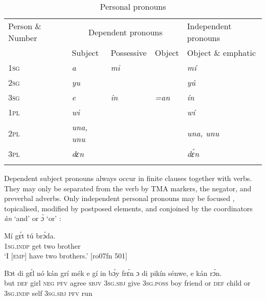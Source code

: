\begin{table}
\caption{Personal pronouns}
\label{tab:key:5.6}

\begin{tabularx}{\textwidth}{Xllll}
\lsptoprule

Person \& Number & \multicolumn{3}{c}{ Dependent pronouns} & Independent pronouns\\
& Subject & \multicolumn{1}{c}{ Possessive} & \multicolumn{1}{c}{ Object} & Object \& emphatic\\
\midrule
\textsc{1sg} & \itshape a & \itshape mi &  & \itshape mí\\
\textsc{2sg} & \itshape yu &  &  & \itshape yú\\
\textsc{3sg} & \itshape e & \itshape in & \itshape =an & \itshape ín\\
\textsc{1pl} & \itshape wi &  &  & \itshape wí\\
\textsc{2pl} & \itshape una, unu &  &  & \itshape una, unu\\
\textsc{3pl} & \itshape dɛn &  &  & \itshape dɛ́n\\
\lspbottomrule
\end{tabularx}
\end{table}
Dependent subject pronouns always occur in finite clauses together with verbs. They may only be separated from the verb by TMA markers, the negator, and preverbal adverbs. Only independent personal pronouns may be focused , topicalised, modified by postposed elements, and conjoined by the coordinators \textit{àn} ‘and’ or \textit{ɔ̀} ‘or’ :


\ea%
    \label{ex:key:278}
    \gll Mí    gɛ́t  tú  brɔ́da.\\
\textsc{1sg.indp}  get  two  brother\\

\glt ‘I [\textsc{emp}] have two brothers.’ [ro07fn 501]
\z


\ea%
    \label{ex:key:279}
    \gll Bɔt  di  gɛ́l  nó  kán  grí    mék    e    gí  in    bɔ́y  frɛ́n
ɔ  di  pikín       sénwe,  e    kán  rɔ́n.\\
but  \textsc{def}  girl  \textsc{neg}  \textsc{pfv}  agree  \textsc{sbjv}    \textsc{3sg.sbj}  give  \textsc{3sg.poss}  boy  friend
or  \textsc{def}  child  or  \textsc{3sg.indp}  self    \textsc{3sg.sbj}  \textsc{pfv}  run\\

